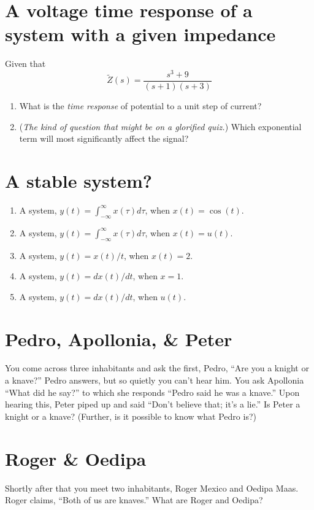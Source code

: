 \documentclass[11pt]{book}
\begin{document}
\section{A voltage time response of a system with a given impedance}
Given that 
\begin{equation}
	\tilde{Z}(s) = \frac{s^3+9}{(s+1)(s+3)}
\end{equation}
\begin{enumerate}
	\item What is the \textit{time response} of potential to a unit step of current?
	\item (\textit{The kind of question that might be on a glorified quiz.}) Which exponential term will most significantly affect the signal?
\end{enumerate}

\section{A stable system?}
\begin{enumerate}
	\item A system, $y(t) = \int_{-\infty}^{\infty}x(\tau)d\tau$, when $x(t) = \cos(t)$.
	\item A system, $y(t) = \int_{-\infty}^{\infty}x(\tau)d\tau$, when $x(t) = u(t)$.
	\item A system, $y(t) = x(t)/t$, when $x(t) = 2$.
	\item A system, $y(t) = dx(t)/dt$, when $x=1$.
	\item A system, $y(t) = dx(t)/dt$, when $u(t)$.
\end{enumerate}

\section{Pedro, Apollonia, \& Peter}
You come across three inhabitants and ask the first, Pedro, ``Are you a knight or a knave?'' Pedro answers, but so quietly you can't hear him. You ask Apollonia ``What did he say?'' to which she responds ``Pedro said he was a knave.'' Upon hearing this, Peter piped up and said ``Don't believe that; it’s a lie.'' Is Peter a knight or a knave? (Further, is it possible to know what Pedro is?)


\section{Roger \& Oedipa} 
Shortly after that you meet two inhabitants, Roger Mexico and Oedipa Maas. Roger claims, ``Both of us are knaves.'' What are Roger and Oedipa?
\end{document}

